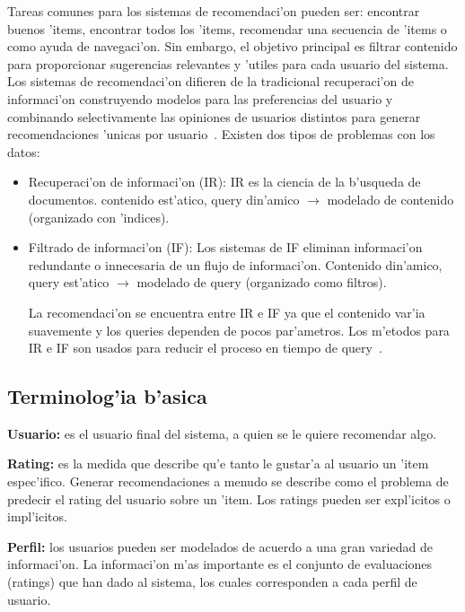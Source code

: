 \documentclass[11pt]{article}
\begin{document}
Tareas comunes para los sistemas de recomendaci'on pueden ser: encontrar buenos 'items, encontrar todos los 'items, recomendar una secuencia de 'items o como ayuda de navegaci'on. Sin embargo, el objetivo principal es filtrar contenido para proporcionar sugerencias relevantes y 'utiles para cada usuario del sistema. Los sistemas de recomendaci'on difieren de la tradicional recuperaci'on de informaci'on construyendo modelos para las preferencias del usuario y combinando selectivamente las opiniones de usuarios distintos para generar recomendaciones 'unicas por usuario~\cite{recsys:nlathia}. Existen dos tipos de problemas con los datos:
\begin{itemize}
\item Recuperaci'on de informaci'on (IR): IR es la ciencia de la b'usqueda de documentos. contenido est'atico, query din'amico $\rightarrow$ modelado de contenido (organizado con 'indices).
\item Filtrado de informaci'on (IF): Los sistemas de IF eliminan informaci'on redundante o innecesaria de un flujo de informaci'on. Contenido din'amico, query est'atico $\rightarrow$ modelado de query (organizado como filtros).

La recomendaci'on se encuentra entre IR e IF ya que el contenido var'ia suavemente y los queries dependen de pocos par'ametros. Los m'etodos para IR e IF son usados para reducir el proceso en tiempo de query~\cite{recsys:alban}.
\end{itemize}

\subsection{Terminolog'ia b'asica}

\smallskip
\textbf{Usuario:} es el usuario final del sistema, a quien se le quiere recomendar algo.

\smallskip
\textbf{Rating:} es la medida que describe qu'e tanto le gustar'a al usuario un 'item espec'ifico. Generar recomendaciones a menudo se describe como el problema de predecir el rating del usuario sobre un 'item. Los ratings pueden ser expl'icitos o impl'icitos.

\smallskip
\textbf{Perfil:} los usuarios pueden ser modelados de acuerdo a una gran variedad de informaci'on. La informaci'on m'as importante es el conjunto de evaluaciones (ratings) que han dado al sistema, los cuales corresponden a cada perfil de usuario.
\end{document}
